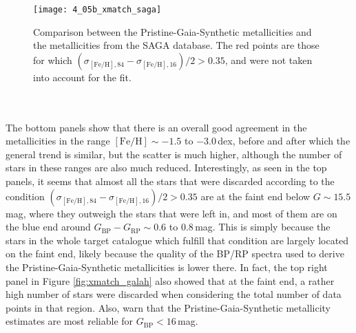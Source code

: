 \documentclass[a4paper,11pt]{article}
\begin{document}
%
\begin{figure}[ht]
 \centering
 \texttt{[image: 4\_05b\_xmatch\_saga]}
 \caption[Metallicity comparison to SAGA]{Comparison between the Pristine-Gaia-Synthetic metallicities and the metallicities from the SAGA database. The red points are those for which $(\sigma_{\mathrm{[Fe/H]},84}-\sigma_{\mathrm{[Fe/H]},16})/2>0.35$, and were not taken into account for the fit.}
 \label{fig:xmatch_saga}
\end{figure}\\ \\
%
The bottom panels show that there is an overall good agreement in the metallicities in the range $\mathrm{[Fe/H]}\sim-1.5$ to $-3.0$\,dex, before and after which the general trend is similar, but the scatter is much higher, although the number of stars in these ranges are also much reduced. Interestingly, as seen in the top panels, it seems that almost all the stars that were discarded according to the condition $(\sigma_{\mathrm{[Fe/H]},84}-\sigma_{\mathrm{[Fe/H]},16})/2>0.35$ are at the faint end below $G\sim15.5$\,mag, where they outweigh the stars that were left in, and most of them are on the blue end around $G_\mathrm{BP}-G_\mathrm{RP}\sim0.6$ to $0.8$\,mag. This is simply because the stars in the whole target catalogue which fulfill that condition are largely located on the faint end, likely because the quality of the BP/RP spectra used to derive the Pristine-Gaia-Synthetic metallicities is lower there. In fact, the top right panel in Figure \ref{fig:xmatch_galah} also showed that at the faint end, a rather high number of stars were discarded when considering the total number of data points in that region. Also, \citet{pristinegaia} warn that the Pristine-Gaia-Synthetic metallicity estimates are most reliable for $G_\mathrm{BP}<16$\,mag.
%
\end{document}
